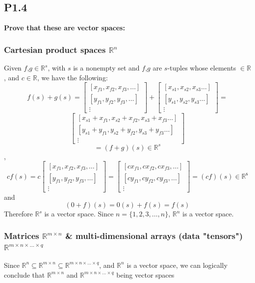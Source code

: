 \documentclass[12pt]{article}
\begin{document}
\subsection*{P1.4}
{\bfseries Prove that these are vector spaces:}
\subsubsection*{Cartesian product spaces $\mathbb{R}^n$}
Given $f$,$g \in \mathbb{R}^s$, with $s$ is a nonempty set and $f$,$g$ are $s$-tuples whose elements $\in \mathbb{R}$, and $c \in \mathbb{R}$, we have the following: 
$$f(s)+g(s)=\begin{bmatrix}
[x_{f1},x_{f2},x_{f3},\ldots]\\
[y_{f1},y_{f2},y_{f3},\ldots]\\
\vdots
\end{bmatrix} + 
\begin{bmatrix}
[x_{s1}, x_{s2}, x_{s3}\ldots]\\
[y_{s1}, y_{s2}, y_{s3}\ldots]\\
\vdots
\end{bmatrix}=
$$
$$
\begin{bmatrix}
[x_{s1} + x_{f1}, x_{s2} + x_{f2}, x_{s3} + x_{f3}\ldots]\\
[y_{s1} + y_{f1}, y_{s2} + y_{f2}, y_{s3} + y_{f3}\ldots]\\
\vdots
\end{bmatrix}$$
$$=(f+g)(s) \in \mathbb{R}^s$$ 
, $$cf(s)=c\begin{bmatrix}
[x_{f1},x_{f2},x_{f3},\ldots]\\
[y_{f1},y_{f2},y_{f3},\ldots]\\
\vdots
\end{bmatrix}
= \begin{bmatrix}
[cx_{f1},cx_{f2},cx_{f3},\ldots]\\
[cy_{f1},cy_{f2},cy_{f3},\ldots]\\
\vdots
\end{bmatrix}= (cf)(s) \in \mathbb{R}^\mathsf{s}$$
and
$$ (0+f)(s) = 0(s) + f(s) = f(s) $$
Therefore $\mathbb{R}^s$ is a vector space. Since $n = \{1,2,3,\ldots,n\}$, $\mathbb{R}^n$ is a vector space.

\subsubsection*{Matrices $\mathbb{R}^{m\times n}$ \& multi-dimensional arrays (data "tensors") $\mathbb{R}^{m\times n\times\dots\times q}$}
Since $\mathbb{R}^{n} \subseteq \mathbb{R}^{m \times n} \subseteq \mathbb{R}^{m\times n\times\dots\times q}$, and $\mathbb{R}^{n}$ is a vector space, we can logically conclude that $\mathbb{R}^{m \times n}$ and $\mathbb{R}^{m\times n\times\dots\times q}$ being vector spaces
\end{document}

